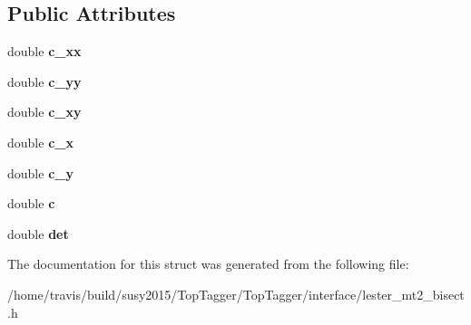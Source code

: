 \subsection*{Public Attributes}
\begin{DoxyCompactItemize}
\item 
\hypertarget{structLester_1_1EllipseParams_a95afe64aa1687111e1317fa4045fc55c}{double {\bfseries c\-\_\-xx}}\label{structLester_1_1EllipseParams_a95afe64aa1687111e1317fa4045fc55c}

\item 
\hypertarget{structLester_1_1EllipseParams_a494ff14d11c07b4428bca666ea8343b3}{double {\bfseries c\-\_\-yy}}\label{structLester_1_1EllipseParams_a494ff14d11c07b4428bca666ea8343b3}

\item 
\hypertarget{structLester_1_1EllipseParams_a4f0a5a453728e503760325677c01b713}{double {\bfseries c\-\_\-xy}}\label{structLester_1_1EllipseParams_a4f0a5a453728e503760325677c01b713}

\item 
\hypertarget{structLester_1_1EllipseParams_a6c0631a050a6564c804c35aea4997c29}{double {\bfseries c\-\_\-x}}\label{structLester_1_1EllipseParams_a6c0631a050a6564c804c35aea4997c29}

\item 
\hypertarget{structLester_1_1EllipseParams_a8b000ff58e2ff2511da0f6234e191e6e}{double {\bfseries c\-\_\-y}}\label{structLester_1_1EllipseParams_a8b000ff58e2ff2511da0f6234e191e6e}

\item 
\hypertarget{structLester_1_1EllipseParams_a86dd4c4bad1eee26d81071efa1137114}{double {\bfseries c}}\label{structLester_1_1EllipseParams_a86dd4c4bad1eee26d81071efa1137114}

\item 
\hypertarget{structLester_1_1EllipseParams_ad777140c2b6da121e1fa322b76b12a9e}{double {\bfseries det}}\label{structLester_1_1EllipseParams_ad777140c2b6da121e1fa322b76b12a9e}

\end{DoxyCompactItemize}


The documentation for this struct was generated from the following file\-:\begin{DoxyCompactItemize}
\item 
/home/travis/build/susy2015/\-Top\-Tagger/\-Top\-Tagger/interface/lester\-\_\-mt2\-\_\-bisect.\-h\end{DoxyCompactItemize}

